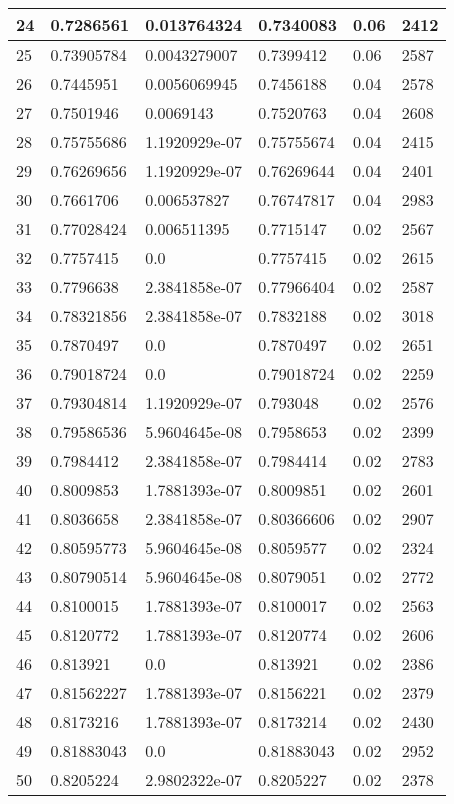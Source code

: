 \begin{longtable}{|l|l|l|l|l|l|}
24 & 0.7286561 & 0.013764324 & 0.7340083 & 0.06 & 2412 \\ \hline 
25 & 0.73905784 & 0.0043279007 & 0.7399412 & 0.06 & 2587 \\ \hline 
26 & 0.7445951 & 0.0056069945 & 0.7456188 & 0.04 & 2578 \\ \hline 
27 & 0.7501946 & 0.0069143 & 0.7520763 & 0.04 & 2608 \\ \hline 
28 & 0.75755686 & 1.1920929e-07 & 0.75755674 & 0.04 & 2415 \\ \hline 
29 & 0.76269656 & 1.1920929e-07 & 0.76269644 & 0.04 & 2401 \\ \hline 
30 & 0.7661706 & 0.006537827 & 0.76747817 & 0.04 & 2983 \\ \hline 
31 & 0.77028424 & 0.006511395 & 0.7715147 & 0.02 & 2567 \\ \hline 
32 & 0.7757415 & 0.0 & 0.7757415 & 0.02 & 2615 \\ \hline 
33 & 0.7796638 & 2.3841858e-07 & 0.77966404 & 0.02 & 2587 \\ \hline 
34 & 0.78321856 & 2.3841858e-07 & 0.7832188 & 0.02 & 3018 \\ \hline 
35 & 0.7870497 & 0.0 & 0.7870497 & 0.02 & 2651 \\ \hline 
36 & 0.79018724 & 0.0 & 0.79018724 & 0.02 & 2259 \\ \hline 
37 & 0.79304814 & 1.1920929e-07 & 0.793048 & 0.02 & 2576 \\ \hline 
38 & 0.79586536 & 5.9604645e-08 & 0.7958653 & 0.02 & 2399 \\ \hline 
39 & 0.7984412 & 2.3841858e-07 & 0.7984414 & 0.02 & 2783 \\ \hline 
40 & 0.8009853 & 1.7881393e-07 & 0.8009851 & 0.02 & 2601 \\ \hline 
41 & 0.8036658 & 2.3841858e-07 & 0.80366606 & 0.02 & 2907 \\ \hline 
42 & 0.80595773 & 5.9604645e-08 & 0.8059577 & 0.02 & 2324 \\ \hline 
43 & 0.80790514 & 5.9604645e-08 & 0.8079051 & 0.02 & 2772 \\ \hline 
44 & 0.8100015 & 1.7881393e-07 & 0.8100017 & 0.02 & 2563 \\ \hline 
45 & 0.8120772 & 1.7881393e-07 & 0.8120774 & 0.02 & 2606 \\ \hline 
46 & 0.813921 & 0.0 & 0.813921 & 0.02 & 2386 \\ \hline 
47 & 0.81562227 & 1.7881393e-07 & 0.8156221 & 0.02 & 2379 \\ \hline 
48 & 0.8173216 & 1.7881393e-07 & 0.8173214 & 0.02 & 2430 \\ \hline 
49 & 0.81883043 & 0.0 & 0.81883043 & 0.02 & 2952 \\ \hline 
50 & 0.8205224 & 2.9802322e-07 & 0.8205227 & 0.02 & 2378 \\ \hline 
\end{longtable}